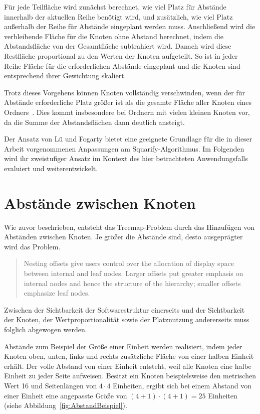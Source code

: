 Für jede Teilfläche wird zunächst berechnet, wie viel Platz für Abstände innerhalb der aktuellen Reihe benötigt wird, und zusätzlich, wie viel Platz außerhalb der Reihe für Abstände eingeplant werden muss. Anschließend wird die verbleibende Fläche für die Knoten ohne Abstand berechnet, indem die Abstandsfläche von der Gesamtfläche subtrahiert wird. Danach wird diese Restfläche proportional zu den Werten der Knoten aufgeteilt. So ist in jeder Reihe Fläche für die erforderlichen Abstände eingeplant und die Knoten sind entsprechend ihrer Gewichtung skaliert.

Trotz dieses Vorgehens können Knoten vollständig verschwinden, wenn der für Abstände erforderliche Platz größer ist als die gesamte Fläche aller Knoten eines Ordners~\cite{lu2008cascaded}. Dies kommt insbesondere bei Ordnern mit vielen kleinen Knoten vor, da die Summe der Abstandsflächen dann deutlich ansteigt.

Der Ansatz von Lü und Fogarty bietet eine geeignete Grundlage für die in dieser Arbeit vorgenommenen Anpassungen am Squarify-Algorithmus. Im Folgenden wird ihr zweistufiger Ansatz im Kontext des hier betrachteten Anwendungsfalls evaluiert und weiterentwickelt.

\section{Abstände zwischen Knoten} \label{sec:AbständeZwischenKnoten}

Wie zuvor beschrieben, entsteht das Treemap-Problem durch das Hinzufügen von Abständen zwischen Knoten. Je größer die Abstände sind, desto ausgeprägter wird das Problem.
\begin{quote}
    Nesting offsets give users control over the allocation of display space between internal and leaf nodes. Larger offsets put greater emphasis on internal nodes and hence the structure of the hierarchy; smaller offsets emphasize leaf nodes.~\cite[48]{johnson1993treemapsPhd}
\end{quote}
Zwischen der Sichtbarkeit der Softwarestruktur einerseits und der Sichtbarkeit der Knoten, der Wertproportionalität sowie der Platznutzung andererseits muss folglich abgewogen werden.

Abstände zum Beispiel der Größe einer Einheit werden realisiert, indem jeder Knoten oben, unten, links und rechts zusätzliche Fläche von einer halben Einheit erhält. Der volle Abstand von einer Einheit entsteht, weil alle Knoten eine halbe Einheit zu jeder Seite aufweisen. Besitzt ein Knoten beispielsweise den metrischen Wert 16 und Seitenlängen von $4 \cdot 4$ Einheiten, ergibt sich bei einem Abstand von einer Einheit eine angepasste Größe von $(4 + 1) \cdot (4 + 1) = 25$ Einheiten (siehe Abbildung~\ref{fig:AbstandBeispiel}).

